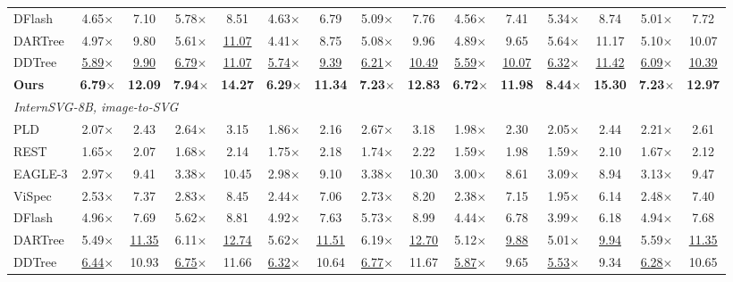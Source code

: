 \begin{table}[t]
\begin{tabular*}{\textwidth}{@{\extracolsep{\fill}}l*{14}{c}@{}}
DFlash & 4.65$\times$ & 7.10 & 5.78$\times$ & 8.51 & 4.63$\times$ & 6.79 & 5.09$\times$ & 7.76 & 4.56$\times$ & 7.41 & 5.34$\times$ & 8.74 & 5.01$\times$ & 7.72 \\
DARTree & 4.97$\times$ & 9.80 & 5.61$\times$ & \underline{11.07} & 4.41$\times$ & 8.75 & 5.08$\times$ & 9.96 & 4.89$\times$ & 9.65 & 5.64$\times$ & 11.17 & 5.10$\times$ & 10.07 \\
DDTree & \underline{5.89}$\times$ & \underline{9.90} & \underline{6.79}$\times$ & \underline{11.07} & \underline{5.74}$\times$ & \underline{9.39} & \underline{6.21}$\times$ & \underline{10.49} & \underline{5.59}$\times$ & \underline{10.07} & \underline{6.32}$\times$ & \underline{11.42} & \underline{6.09}$\times$ & \underline{10.39} \\
\textbf{Ours} & \textbf{6.79}$\times$ & \textbf{12.09} & \textbf{7.94}$\times$ & \textbf{14.27} & \textbf{6.29}$\times$ & \textbf{11.34} & \textbf{7.23}$\times$ & \textbf{12.83} & \textbf{6.72}$\times$ & \textbf{11.98} & \textbf{8.44}$\times$ & \textbf{15.30} & \textbf{7.23}$\times$ & \textbf{12.97} \\
\midrule
\multicolumn{15}{l}{\textit{InternSVG-8B, image-to-SVG}} \\
PLD & 2.07$\times$ & 2.43 & 2.64$\times$ & 3.15 & 1.86$\times$ & 2.16 & 2.67$\times$ & 3.18 & 1.98$\times$ & 2.30 & 2.05$\times$ & 2.44 & 2.21$\times$ & 2.61 \\
REST & 1.65$\times$ & 2.07 & 1.68$\times$ & 2.14 & 1.75$\times$ & 2.18 & 1.74$\times$ & 2.22 & 1.59$\times$ & 1.98 & 1.59$\times$ & 2.10 & 1.67$\times$ & 2.12 \\
EAGLE-3 & 2.97$\times$ & 9.41 & 3.38$\times$ & 10.45 & 2.98$\times$ & 9.10 & 3.38$\times$ & 10.30 & 3.00$\times$ & 8.61 & 3.09$\times$ & 8.94 & 3.13$\times$ & 9.47 \\
ViSpec & 2.53$\times$ & 7.37 & 2.83$\times$ & 8.45 & 2.44$\times$ & 7.06 & 2.73$\times$ & 8.20 & 2.38$\times$ & 7.15 & 1.95$\times$ & 6.14 & 2.48$\times$ & 7.40 \\
DFlash & 4.96$\times$ & 7.69 & 5.62$\times$ & 8.81 & 4.92$\times$ & 7.63 & 5.73$\times$ & 8.99 & 4.44$\times$ & 6.78 & 3.99$\times$ & 6.18 & 4.94$\times$ & 7.68 \\
DARTree & 5.49$\times$ & \underline{11.35} & 6.11$\times$ & \underline{12.74} & 5.62$\times$ & \underline{11.51} & 6.19$\times$ & \underline{12.70} & 5.12$\times$ & \underline{9.88} & 5.01$\times$ & \underline{9.94} & 5.59$\times$ & \underline{11.35} \\
DDTree & \underline{6.44}$\times$ & 10.93 & \underline{6.75}$\times$ & 11.66 & \underline{6.32}$\times$ & 10.64 & \underline{6.77}$\times$ & 11.67 & \underline{5.87}$\times$ & 9.65 & \underline{5.53}$\times$ & 9.34 & \underline{6.28}$\times$ & 10.65 \\

\end{tabular*}
\end{table}
